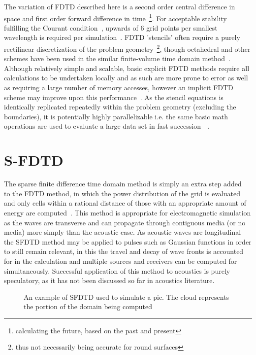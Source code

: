 \documentclass{svproc}
\begin{document}
 The variation of FDTD described here is a second order central difference in space and first order forward difference in time~\footnote{calculating the future, based on the past and present}. For acceptable stability fulfilling the Courant condition~\cite{Abdulkadir2015}, upwards of 6 grid points per smallest wavelength is required per simulation~\cite{Oxnard2015}. FDTD 'stencils' often require a purely rectilinear discretization of the problem geometry~\footnote{thus not necessarily being accurate for round surfaces}, though octahedral and other schemes have been used in the similar finite-volume time domain method~\cite{Bilbao2016}. Although relatively simple and scalable, basic explicit FDTD methods require all calculations to be undertaken locally and as such are more prone to error as well as requiring a large number of memory accesses, however an implicit FDTD scheme may improve upon this performance~\cite{Hamilton2014}. As the stencil equations is identically replicated repeatedly within the problem geometry (excluding the boundaries), it is potentially highly parallelizable i.e. the same basic math operations are used to evaluate a large data set in fast succession~\cite{Savioja2010}~\cite{Angus2010}.

\newpage
\section{S-FDTD}
The sparse finite difference time domain method is simply an extra step added~\cite{excluding some extra boundary handling to ensure stability} to the FDTD method, in which the power distribution of the grid is evaluated and only cells within a rational distance of those with an appropriate amount of energy are computed~\cite{Doerr2013}. This method is appropriate for electromagnetic simulation as the waves are transverse and can propagate through contiguous media (or no media) more simply than the acoustic case. As acoustic waves are longitudinal the SFDTD method may be applied to pulses such as Gaussian functions in order to still remain relevant, in this the travel and decay of wave fronts is accounted for in the calculation and multiple sources and receivers can be computed for simultaneously. Successful application of this method to acoustics is purely speculatory, as it has not been discussed so far in acoustics literature. 
\begin{figure}
\centering
\centering
\caption{An example of SFDTD used to simulate a pic. The cloud represents the portion of the domain being computed ~\cite{Doerr2013}}
\end{figure}
\end{document}
